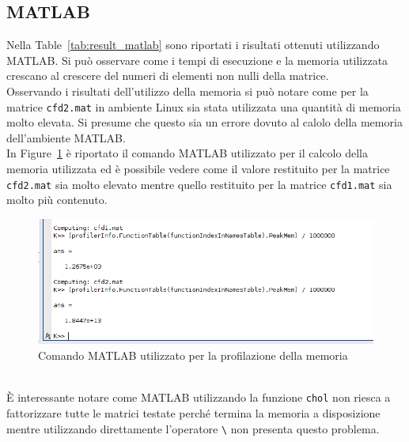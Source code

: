 \documentclass{report}
\begin{document}
            \subsection{MATLAB}
                Nella Table~\ref{tab:result_matlab} sono riportati i risultati ottenuti utilizzando MATLAB.
                Si può osservare come i tempi di esecuzione e la memoria utilizzata crescano al crescere del numeri di
                elementi non nulli della matrice.\\
                Osservando i risultati dell'utilizzo della memoria si può notare come per la matrice \texttt{cfd2.mat}
                in ambiente Linux sia stata utilizzata una quantità di memoria molto elevata. Si presume che questo
                sia un errore dovuto al calolo della memoria dell'ambiente MATLAB.\\
                In Figure~\ref{fig:matlab_overflow} è riportato il comando MATLAB utilizzato per il calcolo della 
                memoria utilizzata ed è possibile vedere come il valore restituito per la matrice \texttt{cfd2.mat} sia
                molto elevato mentre quello restituito per la matrice \texttt{cfd1.mat} sia molto più contenuto.
                \begin{figure}[h]
                    \includegraphics[width=\textwidth]{matlab_overflow}
                    \caption{Comando MATLAB utilizzato per la profilazione della memoria}
                    \label{fig:matlab_overflow}
                \end{figure}\\
                \`E interessante notare come MATLAB utilizzando la funzione \texttt{chol} non riesca a fattorizzare
                tutte le matrici testate perché termina la memoria a disposizione mentre utilizzando direttamente
                l'operatore \verb$\$ non presenta questo problema.\\
\end{document}
